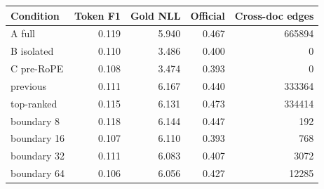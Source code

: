 \begin{tabular}{lrrrr}
\toprule
Condition & Token F1 & Gold NLL & Official & Cross-doc edges \\
\midrule
A full & 0.119 & 5.940 & 0.467 & 665894 \\
B isolated & 0.110 & 3.486 & 0.400 & 0 \\
C pre-RoPE & 0.108 & 3.474 & 0.393 & 0 \\
previous & 0.111 & 6.167 & 0.440 & 333364 \\
top-ranked & 0.115 & 6.131 & 0.473 & 334414 \\
boundary 8 & 0.118 & 6.144 & 0.447 & 192 \\
boundary 16 & 0.107 & 6.110 & 0.393 & 768 \\
boundary 32 & 0.111 & 6.083 & 0.407 & 3072 \\
boundary 64 & 0.106 & 6.056 & 0.427 & 12285 \\
\bottomrule
\end{tabular}
